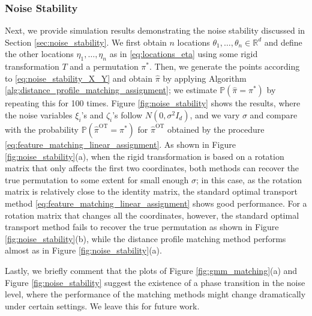 \documentclass[11pt,letterpaper]{article}
\theoremstyle{definition}
\numberwithin{equation}{section}
\newcommand{\R}{\mathbb{R}}
\renewcommand{\P}{\mathbb{P}}
\begin{document}
\subsubsection{Noise Stability}
Next, we provide simulation results demonstrating the noise stability discussed in Section \ref{sec:noise_stability}. We first obtain $n$ locations $\theta_1, \ldots, \theta_n \in \R^d$ and define the other locations $\eta_1, \ldots, \eta_n$ as in \eqref{eq:locations_eta} using some rigid transformation $T$ and a permutation $\pi^\ast$. Then, we generate the points according to \eqref{eq:noise_stability_X_Y} and obtain $\hat{\pi}$ by applying Algorithm \ref{alg:distance_profile_matching_assignment}; we estimate $\P(\hat{\pi} = \pi^\ast)$ by repeating this for 100 times. Figure \ref{fig:noise_stability} shows the results, where the noise variables $\xi_i$'s and $\zeta_i$'s follow $N(0, \sigma^2 I_d)$, and we vary $\sigma$ and compare with the probability $\P(\hat{\pi}^{\mathrm{OT}} = \pi^\ast)$ for $\hat{\pi}^{\mathrm{OT}}$ obtained by the procedure \eqref{eq:feature_matching_linear_assignment}. As shown in Figure \ref{fig:noise_stability}(a), when the rigid transformation is based on a rotation matrix that only affects the first two coordinates, both methods can recover the true permutation to some extent for small enough $\sigma$; in this case, as the rotation matrix is relatively close to the identity matrix, the standard optimal transport method \eqref{eq:feature_matching_linear_assignment} shows good performance. For a rotation matrix that changes all the coordinates, however, the standard optimal transport method fails to recover the true permutation as shown in Figure \ref{fig:noise_stability}(b), while the distance profile matching method performs almost as in Figure \ref{fig:noise_stability}(a).

Lastly, we briefly comment that the plots of Figure \ref{fig:gmm_matching}(a) and Figure \ref{fig:noise_stability} suggest the existence of a phase transition in the noise level, where the performance of the matching methods might change dramatically under certain settings. We leave this for future work.
\end{document}

